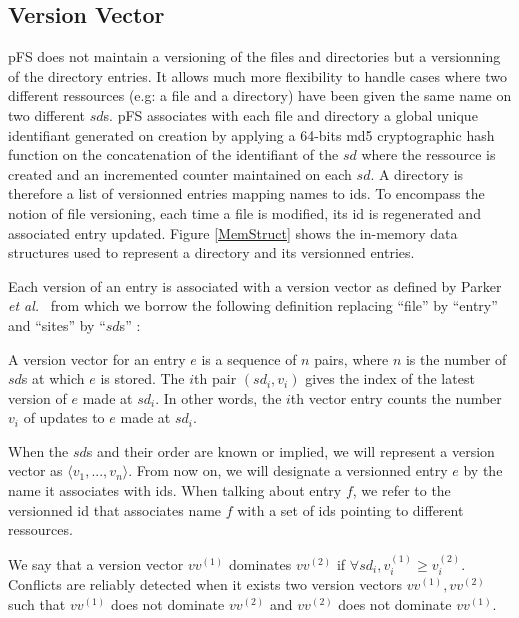 \subsection{Version Vector}

pFS does not maintain a versioning of the files and directories but a
versionning of the directory entries. It allows much more flexibility
to handle cases where two different ressources (e.g: a file and a
directory) have been given the same name on two different $sd$s.  pFS
associates with each file and directory a global unique identifiant
generated on creation by applying a 64-bits md5 cryptographic hash
function on the concatenation of the identifiant of the $sd$ where the
ressource is created and an incremented counter maintained on each
$sd$. A directory is therefore a list of versionned entries mapping
names to ids. To encompass the notion of file versioning, each time a
file is modified, its id is regenerated and associated entry
updated. Figure \ref{MemStruct} shows the in-memory data structures used to
represent a directory and its versionned entries.

Each version of an entry is associated with a version vector as
defined by Parker \emph{et al.}~\cite{parker:inconsistency} from which we
borrow the following definition replacing ``file'' by ``entry'' and
``sites'' by ``$sd$s'' :

\begin{definition}
A version vector for an entry $e$ is a sequence of $n$ pairs, where
$n$ is the number of $sd$s at which $e$ is stored. The $i$th pair
$(sd_{i}, v_{i})$ gives the index of the latest version of $e$ made at
$sd_{i}$. In other words, the $i$th vector entry counts the number
$v_{i}$ of updates to $e$ made at $sd_{i}$.
\end{definition}

When the $sd$s and their order are known or implied, we will represent a
version vector as $\langle v_{1}, ..., v_{n} \rangle$. From now on, we
will designate a versionned entry $e$ by the name it associates with
ids. When talking about entry $f$, we refer to the versionned id that
associates name $f$ with a set of ids pointing to different
ressources.

We say that a version vector $vv^{(1)}$ dominates $vv^{(2)}$ if
$\forall sd_{i}, v_{i}^{(1)} \geq v_{i}^{(2)}$. Conflicts are reliably
detected when it exists two version vectors $vv^{(1)}, vv^{(2)}$ such
that $vv^{(1)}$ does not dominate $vv^{(2)}$ and $vv^{(2)}$ does not
dominate $vv^{(1)}$. 

